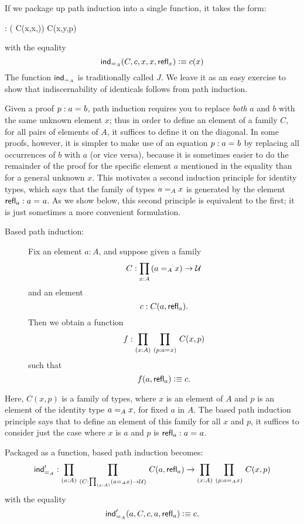 If we package up path induction into a single function, it takes the form:
\begin{narrowmultline*}
   :  
  \Big( C(x,x,)\Big) \to 
  \narrowbreak
     C(x,y,p)
\end{narrowmultline*}
with the equality
\[ \indid{A}(C,c,x,x,\refl{x}) \defeq c(x) \]
The function $ \indid{A}$ is traditionally called $J$.  We leave it as an easy exercise to show that indiscernability of identicals follows from path induction.  

\mentalpause

Given a proof $p : \id{a}{b}$,
path induction requires you to replace \emph{both} $a$ and $b$ with the same unknown element $x$; thus in order to define an element of a family
$C$, for all pairs of elements of $A$, it suffices to define it on the diagonal.
In some proofs, however, it is simpler to make use of an equation $p : \id{a}{b}$ by replacing all occurrences of $b$ with $a$ (or vice versa), because it is sometimes easier to do the remainder of the proof for the specific element $a$ mentioned in the equality than for a general unknown $x$.  This motivates a second induction principle for identity types, which says that the family of types $\id[A]{a}{x}$ is generated by the element $\refl{a} : \id{a}{a}$.  As we show below, this second principle is equivalent to the first; it is just sometimes a more convenient formulation.

%
%
\begin{description}
\item[Based path induction:] 
  Fix an element $a:A$, and suppose given a family
  \[ C : \prd{x:A} (\id[A]{a}{x}) \to \UU \]
  and an element
  \[ c : C(a,\refl{a}). \]
  Then we obtain a function
  \[ f : \prd{x:A}{p:\id{a}{x}} C(x,p) \]
  such that
  \[ f(a,\refl{a}) \defeq c .\]
\end{description}

Here, $C(x,p)$ is a family of types, where $x$ is an element of $A$ and $p$ is an element of the identity type $\id[A]{a}{x}$, for fixed $a$ in $A$. The based path induction principle says that to define an element of this family for all $x$ and $p$, it suffices to consider
just the case where $x$ is $a$ and $p$ is $\refl{a} : \id{a}{a}$.

Packaged as a function, based path induction becomes:
\begin{align*}
  \indidb{A} :  \dprd{a:A}{C : \prd{x:A} (\id[A]{a}{x}) \to \UU}
  C(a,\refl{a}) \to \dprd{x:A}{p : \id[A]{a}{x}} C(x,p) 
\end{align*}
with the equality
\[ \indidb{A}(a,C,c,a,\refl{a}) \defeq c. \]

